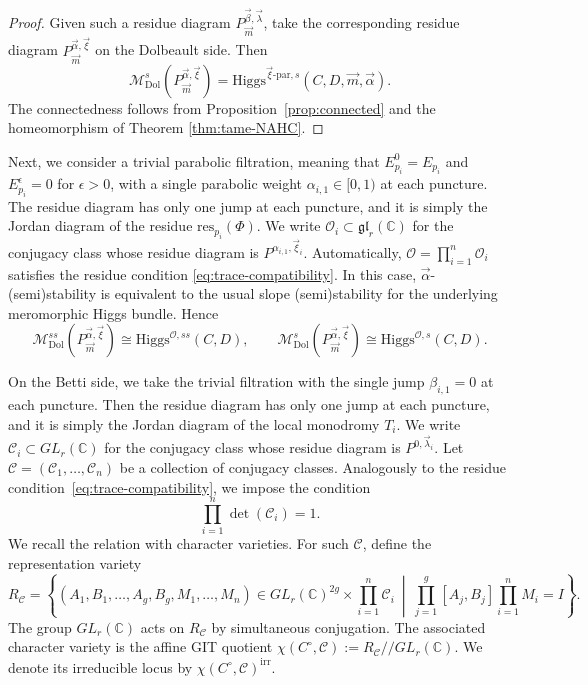 \documentclass[11pt]{amsart}
\theoremstyle{plain}
\theoremstyle{definition}
\theoremstyle{remark}
\newcommand{\C}{\mathbb C}
\newcommand{\cO}{\mathcal O}
\newcommand{\Higgs}{\mathrm{Higgs}}
\def\C{\mathbb{C}}
\def\res{\mathrm{res}}
\begin{document}
\begin{proof}
	Given such a residue diagram $P^{\vec\beta,\vec\lambda}_{\vec m}$, take the corresponding residue diagram $P^{\vec\alpha,\vec\xi}_{\vec m}$ on the Dolbeault side. Then
	\[
	\mathcal M^{s}_{\mathrm{Dol}}(P^{\vec\alpha,\vec\xi}_{\vec m})
	=
	\Higgs^{\vec\xi\text{-par},s}(C,D,\vec m,\vec\alpha).
	\]
	The connectedness follows from Proposition~\ref{prop:connected} and the homeomorphism of Theorem \ref{thm:tame-NAHC}.
\end{proof}

Next, we consider a trivial parabolic filtration, meaning that $E_{p_i}^0=E_{p_i}$ and $E_{p_i}^{\epsilon}=0$ for $\epsilon>0$, with a single parabolic weight $\alpha_{i,1}\in[0,1)$ at each puncture. The residue diagram has only one jump at each puncture, and it is simply the Jordan diagram of the residue $\res_{p_i}(\Phi)$. We write $\cO_i\subset\mathfrak{gl}_r(\C)$ for the conjugacy class whose residue diagram is $P^{\alpha_{i,1},\vec\xi_i}$. Automatically, $\mathcal{O}=\prod_{i=1}^n\mathcal{O}_i$ satisfies the residue condition \eqref{eq:trace-compatibility}. In this case, $\vec\alpha$-(semi)stability is equivalent to the usual slope (semi)stability for the underlying meromorphic Higgs bundle. Hence
\[
\mathcal M^{ss}_{\mathrm{Dol}}(P^{\vec\alpha,\vec\xi}_{\vec m})
\cong
\Higgs^{\cO,ss}(C,D),
\qquad
\mathcal M^{s}_{\mathrm{Dol}}(P^{\vec\alpha,\vec\xi}_{\vec m})
\cong
\Higgs^{\cO,s}(C,D).
\]


On the Betti side, we take the trivial filtration with the single jump $\beta_{i,1}=0$ at each puncture. Then the residue diagram has only one jump at each puncture, and it is simply the Jordan diagram of the local monodromy $T_i$. We write $\mathcal C_i\subset GL_r(\C)$ for the conjugacy class whose residue diagram is $P^{0,\vec\lambda_i}$. Let $\mathcal{C}=(\mathcal C_1,\dots,\mathcal C_n)$ be a collection of conjugacy
classes. Analogously to the residue condition~\eqref{eq:trace-compatibility}, we
impose the condition
\begin{equation}\label{eq:trace-compatibility Betti}
    \prod_{i=1}^n\det(\mathcal C_i)=1.
\end{equation}
We recall the relation with character varieties. For such $\mathcal{C}$, define the representation variety
\[
R_{\mathcal C}
=
\left\{
(A_1,B_1,\ldots,A_g,B_g,M_1,\ldots,M_n)
\in GL_r(\C)^{2g}\times\prod_{i=1}^n\mathcal C_i
\ \middle|\
\prod_{j=1}^g[A_j,B_j]\prod_{i=1}^nM_i=I
\right\}.
\]
The group $GL_r(\C)$ acts on $R_{\mathcal C}$ by simultaneous conjugation. The associated character variety is the affine GIT quotient $\chi(C^\circ,\mathcal C):=R_{\mathcal C}//GL_r(\C)$. We denote its irreducible locus by $\chi(C^\circ,\mathcal C)^{\operatorname{irr}}$.
\end{document}
